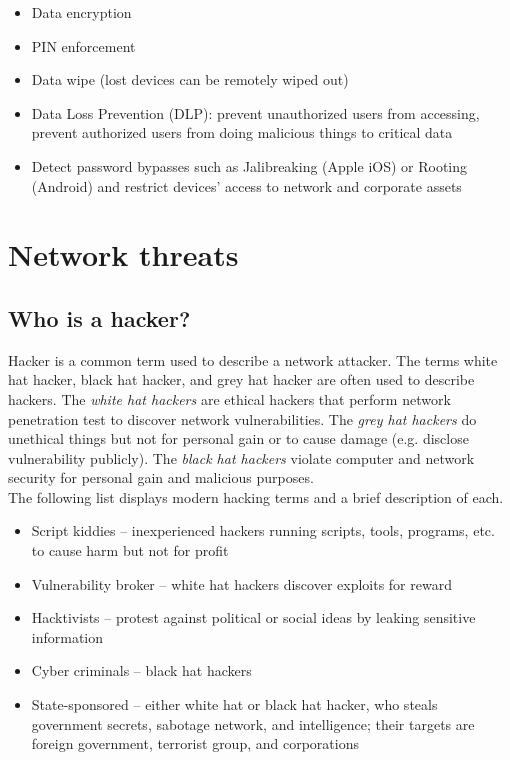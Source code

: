 \begin{itemize}
\item Data encryption
\item PIN enforcement
\item Data wipe (lost devices can be remotely wiped out)
\item Data Loss Prevention (DLP): prevent unauthorized users from accessing, prevent authorized users from doing malicious things to  critical data  
\item Detect password bypasses such as Jalibreaking (Apple iOS) or Rooting (Android) and restrict devices' access to network and corporate assets
\end{itemize}

\section{Network threats}

\subsection{Who is a hacker?}

Hacker is a common term used to describe a network attacker. The terms white hat hacker, black hat hacker, and grey hat hacker are often used to describe hackers. The \emph{white hat hackers} are ethical hackers that perform network penetration test to discover network vulnerabilities. The \emph{grey hat hackers} do unethical things but not for personal gain or to cause damage (e.g. disclose vulnerability publicly). The \emph{black hat hackers} violate computer and network security for personal gain and malicious purposes. \\

The following list displays modern hacking terms and a brief description of each.\\

\begin{itemize}
\item Script kiddies -- inexperienced hackers running scripts, tools, programs, etc. to cause harm but not for profit
\item Vulnerability broker -- white hat hackers discover exploits for reward
\item Hacktivists -- protest against political or social ideas by leaking sensitive information
\item Cyber criminals -- black hat hackers
\item State-sponsored -- either white hat or black hat hacker, who steals government secrets, sabotage network, and intelligence; their targets are foreign government, terrorist group, and corporations
\end{itemize}

